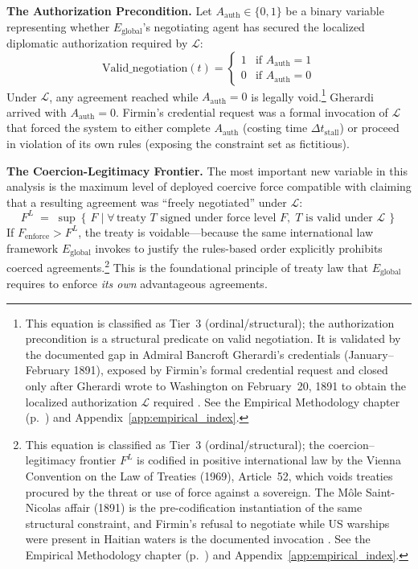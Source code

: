 \textbf{The Authorization Precondition.} Let $A_{\text{auth}} \in \{0, 1\}$ be a binary variable representing whether $E_{\text{global}}$'s negotiating agent has secured the localized diplomatic authorization required by $\mathcal{L}$:
\begin{equation}\label{eq:13.6-authorization-precondition}
\text{Valid\_negotiation}(t) = \begin{cases} 1 & \text{if } A_{\text{auth}} = 1 \\ 0 & \text{if } A_{\text{auth}} = 0 \end{cases}
\end{equation}
Under $\mathcal{L}$, any agreement reached while $A_{\text{auth}} = 0$ is legally void.\footnote{This equation is classified as Tier~3 (ordinal/structural); the authorization precondition is a structural predicate on valid negotiation. It is validated by the documented gap in Admiral Bancroft Gherardi's credentials (January--February 1891), exposed by Firmin's formal credential request and closed only after Gherardi wrote to Washington on February~20, 1891 to obtain the localized authorization $\mathcal{L}$ required \cite{firmin_legacy, manigat}. See the Empirical Methodology chapter (p.~\pageref{ch:empirical_methodology}) and Appendix~\ref{app:empirical_index}.} Gherardi arrived with $A_{\text{auth}} = 0$. Firmin's credential request was a formal invocation of $\mathcal{L}$ that forced the system to either complete $A_{\text{auth}}$ (costing time $\Delta t_{\text{stall}}$) or proceed in violation of its own rules (exposing the constraint set as fictitious).

\textbf{The Coercion-Legitimacy Frontier.} The most important new variable in this analysis is the maximum level of deployed coercive force compatible with claiming that a resulting agreement was ``freely negotiated'' under $\mathcal{L}$:
\begin{equation}\label{eq:13.7-coercion-legitimacy-frontier}
F^L \;=\; \sup\!\left\{\, F \;\Big|\; \forall\, \text{treaty } T \text{ signed under force level } F,\; T \text{ is valid under } \mathcal{L} \,\right\}
\end{equation}
If $F_{\text{enforce}} > F^L$, the treaty is voidable---because the same international law framework $E_{\text{global}}$ invokes to justify the rules-based order explicitly prohibits coerced agreements.\footnote{This equation is classified as Tier~3 (ordinal/structural); the coercion--legitimacy frontier $F^L$ is codified in positive international law by the Vienna Convention on the Law of Treaties (1969), Article~52, which voids treaties procured by the threat or use of force against a sovereign. The M\^{o}le Saint-Nicolas affair (1891) is the pre-codification instantiation of the same structural constraint, and Firmin's refusal to negotiate while US warships were present in Haitian waters is the documented invocation \cite{firmin_legacy, manigat}. See the Empirical Methodology chapter (p.~\pageref{ch:empirical_methodology}) and Appendix~\ref{app:empirical_index}.} This is the foundational principle of treaty law that $E_{\text{global}}$ requires to enforce \textit{its own} advantageous agreements.

